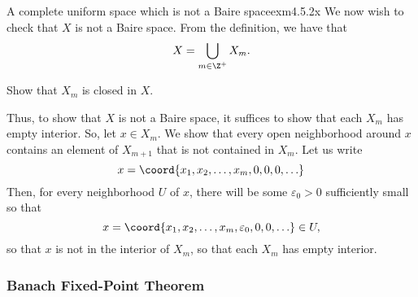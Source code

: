 \begin{exm}{A complete uniform space which is not a Baire space}{exm4.5.2x}
We now wish to check that $X$ is not a Baire space.  From the definition, we have that
\begin{equation}
X=\bigcup _{m\in \Z ^+}X_m.
\end{equation}
\begin{exr}[breakable=false]{}{}
Show that $X_m$ is closed in $X$.
\end{exr}
Thus, to show that $X$ is not a Baire space, it suffices to show that each $X_m$ has empty interior.  So, let $x\in X_m$.  We show that every open neighborhood around $x$ contains an element of $X_{m+1}$ that is not contained in $X_m$.  Let us write
\begin{equation}
x=\coord{x_1,x_2,\ldots ,x_m,0,0,0,\ldots}
\end{equation}
Then, for every neighborhood $U$ of $x$, there will be some $\varepsilon _0>0$ sufficiently small so that
\begin{equation}
x=\coord{x_1,x_2,\ldots ,x_m,\varepsilon _0,0,0,\ldots}\in U,
\end{equation}
so that $x$ is not in the interior of $X_m$, so that each $X_m$ has empty interior.
\end{exm}

\subsubsection{Banach Fixed-Point Theorem}

